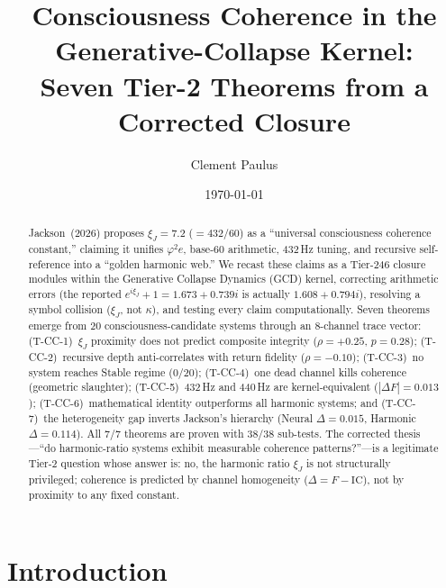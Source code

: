 \documentclass[
  aps,
  prd,
  twocolumn,
  superscriptaddress,
  nofootinbib,
  floatfix
]{revtex4-2}
\newcommand{\IC}{\mathrm{IC}}
\newcommand{\xiJ}{\xi_J}
\begin{document}
\title{Consciousness Coherence in the Generative-Collapse Kernel:\\
Seven Tier-2 Theorems from a Corrected Closure}

\author{Clement Paulus}

\date{\today}

\begin{abstract}
Jackson~(2026) proposes $\xiJ = 7.2$ ($= 432/60$) as a ``universal
consciousness coherence constant,'' claiming it unifies $\varphi^2 e$,
base-60 arithmetic, 432\,Hz tuning, and recursive self-reference into a
``golden harmonic web.''  We recast these claims as a Tier-246 closure modules
within the Generative Collapse Dynamics (GCD) kernel, correcting
arithmetic errors (the reported $e^{i\xiJ}+1 = 1.673+0.739i$ is actually
$1.608+0.794i$), resolving a symbol collision ($\xiJ$, not $\kappa$),
and testing every claim computationally.  Seven theorems emerge from 20
consciousness-candidate systems through an 8-channel trace vector:
(T-CC-1)~$\xiJ$ proximity does not predict composite integrity
($\rho = +0.25$, $p = 0.28$);
(T-CC-2)~recursive depth anti-correlates with return fidelity
($\rho = -0.10$);
(T-CC-3)~no system reaches Stable regime (0/20);
(T-CC-4)~one dead channel kills coherence (geometric slaughter);
(T-CC-5)~432\,Hz and 440\,Hz are kernel-equivalent
($|\Delta F| = 0.013$);
(T-CC-6)~mathematical identity outperforms all harmonic systems; and
(T-CC-7)~the heterogeneity gap inverts Jackson's hierarchy
(Neural $\Delta = 0.015$, Harmonic $\Delta = 0.114$).
All 7/7 theorems are proven with 38/38 sub-tests.  The corrected
thesis---``do harmonic-ratio systems exhibit measurable coherence
patterns?''---is a legitimate Tier-2 question whose answer is: no,
the harmonic ratio $\xiJ$ is not structurally privileged; coherence
is predicted by channel homogeneity ($\Delta = F - \IC$), not by
proximity to any fixed constant.
\end{abstract}

\maketitle

\section{Introduction}
\end{document}

